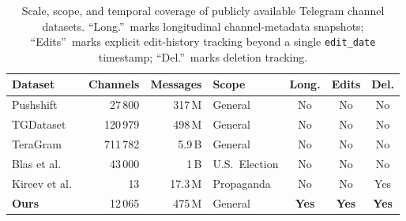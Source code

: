 \begin{table}[htbp]
\centering
\caption[Scale and temporal coverage of public Telegram datasets.]{Scale, scope, and temporal coverage of publicly available Telegram channel datasets. ``Long.''~marks longitudinal channel-metadata snapshots; ``Edits''~marks explicit edit-history tracking beyond a single \texttt{edit\_date} timestamp; ``Del.''~marks deletion tracking.}
\label{tab:dataset-comparison}
\small
\setlength{\tabcolsep}{4pt}
\begin{tabular}{@{}lrrlccc@{}}
\toprule
\textbf{Dataset} & \textbf{Channels} & \textbf{Messages} & \textbf{Scope} & \textbf{Long.} & \textbf{Edits} & \textbf{Del.} \\
\midrule
Pushshift~\cite{baumgartner2020}          & 27\,800      & 317\,M       & General        & No  & No  & No  \\
TGDataset~\cite{lamorgia2025}             & 120\,979     & 498\,M       & General        & No  & No  & No  \\
TeraGram~\cite{teragram2026}              & 711\,782     & 5.9\,B       & General        & No  & No  & No  \\
Blas et al.~\cite{blas2025}               & 43\,000      & 1\,B         & U.S.\ Election & No  & No  & No  \\
Kireev et al.~\cite{propaganda2025}       & 13           & 17.3\,M      & Propaganda     & No  & No  & Yes \\
\textbf{Ours}                              & 12\,065      & 475\,M       & General        & \textbf{Yes} & \textbf{Yes} & \textbf{Yes} \\
\bottomrule
\end{tabular}
\end{table}

